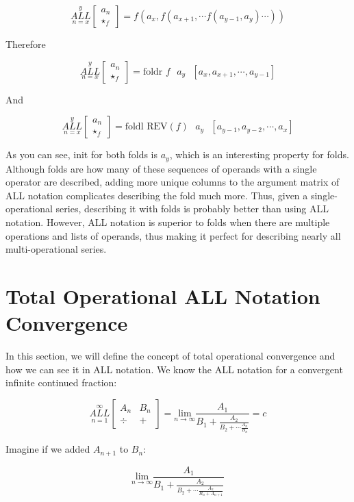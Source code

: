 \documentclass{article}
\begin{document}
$$\underset{n=x}{\overset{y}{ALL}} \begin{bmatrix}
a_n\\
\star_f
\end{bmatrix} = f(a_x,f(a_{x+1},\cdots f(a_{y-1},a_y) \cdots))$$

Therefore

$$\underset{n=x}{\overset{y}{ALL}} \begin{bmatrix}
a_n\\
\star_f
\end{bmatrix} = \text{foldr } f \text{ } a_y \text{ } [a_x,a_{x+1},\cdots,a_{y-1}]$$

And

$$\underset{n=x}{\overset{y}{ALL}} \begin{bmatrix}
a_n\\
\star_f
\end{bmatrix} = \text{foldl } \text{REV}(f) \text{ } a_y \text{ } [a_{y-1},a_{y-2},\cdots,a_x]$$

As you can see, init for both folds is $a_y$, which is an interesting property for folds. Although folds are how many of these sequences of operands with a single operator are described, adding more unique columns to the argument matrix of ALL notation complicates describing the fold much more. Thus, given a single-operational series, describing it with folds is probably better than using ALL notation. However, ALL notation is superior to folds when there are multiple operations and lists of operands, thus making it perfect for describing nearly all multi-operational series.

\section{Total Operational ALL Notation Convergence}

In this section, we will define the concept of total operational convergence and how we can see it in ALL notation. We know the ALL notation for a convergent infinite continued fraction:

$$\underset{n=1}{\overset{\infty}{ALL}} \begin{bmatrix}
A_n & B_n \\
\div & +
\end{bmatrix} = \underset{n \rightarrow \infty}{\text{lim}} \frac{A_1}{B_1+\frac{A_2}{B_2+\cdots\frac{A_n}{B_n}}}=c$$

Imagine if we added $A_{n+1}$ to $B_n$:

$$\underset{n \rightarrow \infty}{\text{lim}} \frac{A_1}{B_1+\frac{A_2}{B_2+\cdots\frac{A_n}{B_n+A_{n+1}}}}$$
\end{document}
